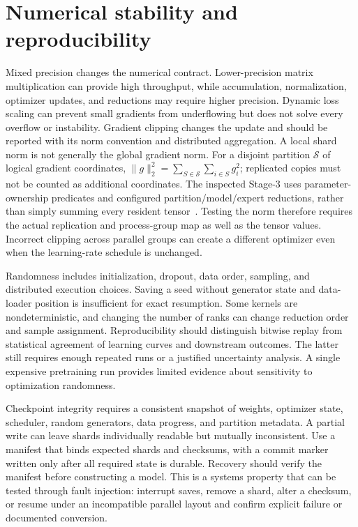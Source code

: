 \section{Numerical stability and reproducibility}
\label{sec:C07:numerics}
Mixed precision changes the numerical contract. Lower-precision matrix multiplication can provide high throughput, while accumulation, normalization, optimizer updates, and reductions may require higher precision. Dynamic loss scaling can prevent small gradients from underflowing but does not solve every overflow or instability. Gradient clipping changes the update and should be reported with its norm convention and distributed aggregation. A local shard norm is not generally the global gradient norm. For a disjoint partition $\mathcal S$ of logical gradient coordinates, $\|g\|_2^2=\sum_{S\in\mathcal S}\sum_{i\in S}g_i^2$; replicated copies must not be counted as additional coordinates. The inspected Stage-3  uses parameter-ownership predicates and configured partition/model/expert reductions, rather than simply summing every resident tensor~\cite{repo_deepspeed}. Testing the norm therefore requires the actual replication and process-group map as well as the tensor values. Incorrect clipping across parallel groups can create a different optimizer even when the learning-rate schedule is unchanged.

Randomness includes initialization, dropout, data order, sampling, and distributed execution choices. Saving a seed without generator state and data-loader position is insufficient for exact resumption. Some kernels are nondeterministic, and changing the number of ranks can change reduction order and sample assignment. Reproducibility should distinguish bitwise replay from statistical agreement of learning curves and downstream outcomes. The latter still requires enough repeated runs or a justified uncertainty analysis. A single expensive pretraining run provides limited evidence about sensitivity to optimization randomness.

Checkpoint integrity requires a consistent snapshot of weights, optimizer state, scheduler, random generators, data progress, and partition metadata. A partial write can leave shards individually readable but mutually inconsistent. Use a manifest that binds expected shards and checksums, with a commit marker written only after all required state is durable. Recovery should verify the manifest before constructing a model. This is a systems property that can be tested through fault injection: interrupt saves, remove a shard, alter a checksum, or resume under an incompatible parallel layout and confirm explicit failure or documented conversion.

